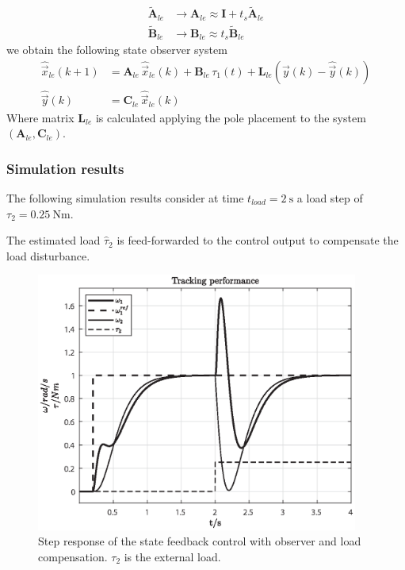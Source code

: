\documentclass[11pt,a4paper,oneside]{book}
\numberwithin{equation}{section}
\theoremstyle{it}
\theoremstyle{definition}
\begin{document}
\begin{equation}
	\begin{aligned}
		\tilde{\mathbf{A}}_{le} &\rightarrow {\mathbf{A}}_{le} \approx 
		\mathbf{I}+t_s\tilde{\mathbf{A}}_{le} \\[6pt]
		\tilde{\mathbf{B}}_{le} &\rightarrow 
		{\mathbf{B}}_{le} \approx t_s\tilde{\mathbf{B}}_{le}
	\end{aligned}
\end{equation}
we obtain the following state observer system
\begin{equation}
	\begin{aligned}
		\hat{\vec{x}}_{le}(k+1)  &= {\mathbf{A}}_{le} \,\hat{\vec{x}}_{le}(k) 
		+{\mathbf{B}}_{le} \,\tau_1(t)+{\mathbf{L}}_{le} \left( \vec{y}(k) - 
		\hat{\vec{y}}(k) \right)  \\[6pt]
		\hat{\vec{y}}(k)  &= \mathbf{C}_{le} \,\hat{\vec{x}}_{le}(k)
	\end{aligned}
\end{equation}
Where matrix $\mathbf{L}_{le}$ is calculated applying the pole placement to the 
system $(\mathbf{A}_{le},\mathbf{C}_{le})$.

\subsubsection{Simulation results}
The following simulation results consider at time $t_{load} = \SI{2}{\second}$ 
a load step of $\tau_2=\SI{0.25}{\newton\meter}$.

The estimated load $\hat{\tau}_2$ is feed-forwarded to the control output to 
compensate the load disturbance.
\begin{figure}[H]
	\centering
	\includegraphics[width = 300pt, keepaspectratio]{figures/msm/track_w_2.eps}
	\captionsetup{width=0.5\textwidth, font=small}
	\caption{Step response of the state feedback control with observer and load 
		compensation. $\tau_2$ is the external load.}
	\label{figure_sim3}
\end{figure}
\end{document}
